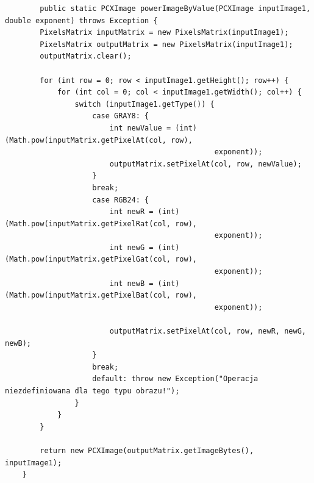 \documentclass{article}
\begin{document}
	\begin{verbatim}
	    public static PCXImage powerImageByValue(PCXImage inputImage1, double exponent) throws Exception {
        PixelsMatrix inputMatrix = new PixelsMatrix(inputImage1);
        PixelsMatrix outputMatrix = new PixelsMatrix(inputImage1);
        outputMatrix.clear();

        for (int row = 0; row < inputImage1.getHeight(); row++) {
            for (int col = 0; col < inputImage1.getWidth(); col++) {
                switch (inputImage1.getType()) {
                    case GRAY8: {
                        int newValue = (int) (Math.pow(inputMatrix.getPixelAt(col, row), 
												exponent));
                        outputMatrix.setPixelAt(col, row, newValue);
                    }
                    break;
                    case RGB24: {
                        int newR = (int) (Math.pow(inputMatrix.getPixelRat(col, row), 
												exponent));
                        int newG = (int) (Math.pow(inputMatrix.getPixelGat(col, row), 
												exponent));
                        int newB = (int) (Math.pow(inputMatrix.getPixelBat(col, row), 
												exponent));
                        
                        outputMatrix.setPixelAt(col, row, newR, newG, newB);
                    }
                    break;
                    default: throw new Exception("Operacja niezdefiniowana dla tego typu obrazu!");
                }
            }
        }

        return new PCXImage(outputMatrix.getImageBytes(), inputImage1);
    }
	\end{verbatim}
	
\end{document}
